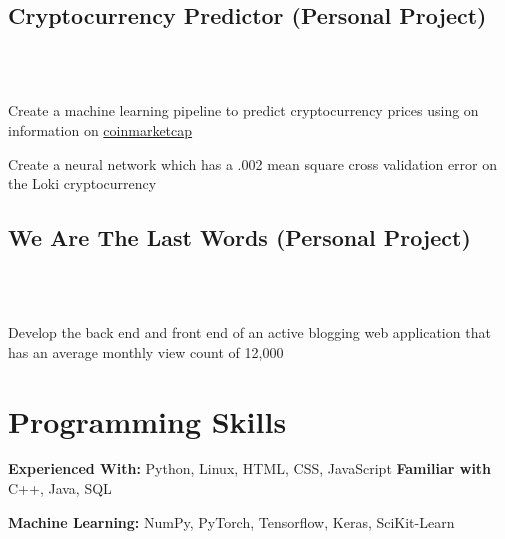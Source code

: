 \documentclass{resume}
\begin{document}
\subsection{Cryptocurrency Predictor (Personal Project)} \\
\\
\begin{tightemize}
    \item Create a machine learning pipeline to predict cryptocurrency prices using on information on {\href{https://coinmarketcap.com/}{coinmarketcap}}
    \item Create a neural network which has a .002 mean square cross validation error on the Loki cryptocurrency
\end{tightemize}

\subsection{We Are The Last Words (Personal Project)}\\
\\
\begin{tightemize}
    \item Develop the back end and front end  of an active blogging web application that has an average monthly view count of 12,000
\end{tightemize}


\section{Programming Skills}

\fontsize{10.5pt}{12pt}\selectfont
\vspace{-1mm}

\textbf{Experienced With:}\hspace{1mm} Python, Linux, HTML, CSS, JavaScript\hspace{1.5mm} \textbf{Familiar with} C++, Java, SQL\vspace{-1mm}

\textbf{Machine Learning:}\hspace{1mm} NumPy, PyTorch, Tensorflow, Keras, SciKit-Learn\vspace{-1mm}
\end{document}

